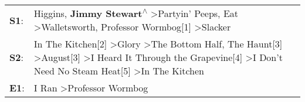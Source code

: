 \begin{supertabular}{p{0.03\textwidth}p{0.92\textwidth}}
 \textbf{S1}:  &                                                                                                              Higgins\textsuperscript{}, \enspace \textbf{Jimmy Stewart\textsuperscript{$\wedge$}} \textgreater \enspace Partyin' Peeps\textsuperscript{}, \enspace Eat\textsuperscript{} \textgreater \enspace Walletsworth\textsuperscript{}, \enspace Professor Wormbog[1]\textsuperscript{} \textgreater \enspace Slacker\textsuperscript{}  \enspace  \\
 \textbf{S2}:  &  In The Kitchen[2]\textsuperscript{} \textgreater \enspace Glory\textsuperscript{} \textgreater \enspace The Bottom Half\textsuperscript{}, \enspace The Haunt[3]\textsuperscript{} \textgreater \enspace August[3]\textsuperscript{} \textgreater \enspace I Heard It Through the Grapevine[4]\textsuperscript{} \textgreater \enspace I Don't Need No Steam Heat[5]\textsuperscript{} \textgreater \enspace In The Kitchen\textsuperscript{}  \enspace  \\
 \textbf{E1}:  &                                                                                                                                                                                                                                                                                                                                                              I Ran\textsuperscript{} \textgreater \enspace Professor Wormbog\textsuperscript{}  \enspace  \\
\end{supertabular}
